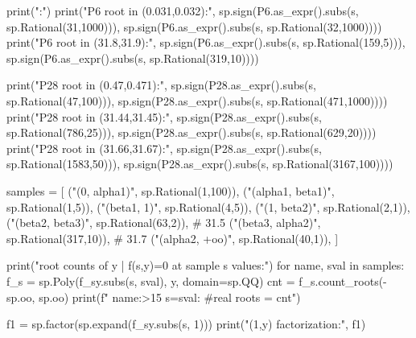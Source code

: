 \documentclass[12pt]{article}
\theoremstyle{remark}
\theoremstyle{definition}
\begin{document}
\begin{code}
print("\nBrackets:")
print("P6 root in (0.031,0.032):", sp.sign(P6.as_expr().subs(s, sp.Rational(31,1000))),
      sp.sign(P6.as_expr().subs(s, sp.Rational(32,1000))))
print("P6 root in (31.8,31.9):", sp.sign(P6.as_expr().subs(s, sp.Rational(159,5))),
      sp.sign(P6.as_expr().subs(s, sp.Rational(319,10))))

print("P28 root in (0.47,0.471):", sp.sign(P28.as_expr().subs(s, sp.Rational(47,100))),
      sp.sign(P28.as_expr().subs(s, sp.Rational(471,1000))))
print("P28 root in (31.44,31.45):", sp.sign(P28.as_expr().subs(s, sp.Rational(786,25))),
      sp.sign(P28.as_expr().subs(s, sp.Rational(629,20))))
print("P28 root in (31.66,31.67):", sp.sign(P28.as_expr().subs(s, sp.Rational(1583,50))),
      sp.sign(P28.as_expr().subs(s, sp.Rational(3167,100))))

samples = [
    ("(0, alpha1)", sp.Rational(1,100)),
    ("(alpha1, beta1)", sp.Rational(1,5)),
    ("(beta1, 1)", sp.Rational(4,5)),
    ("(1, beta2)", sp.Rational(2,1)),
    ("(beta2, beta3)", sp.Rational(63,2)),     # 31.5
    ("(beta3, alpha2)", sp.Rational(317,10)),  # 31.7
    ("(alpha2, +oo)", sp.Rational(40,1)),
]

print("\nReal root counts of y | f(s,y)=0 at sample s values:")
for name, sval in samples:
    f_s = sp.Poly(f_sy.subs(s, sval), y, domain=sp.QQ)
    cnt = f_s.count_roots(-sp.oo, sp.oo)
    print(f"  {name:>15}  s={sval}:  #real roots = {cnt}")

f1 = sp.factor(sp.expand(f_sy.subs(s, 1)))
print("\nf(1,y) factorization:", f1)
\end{code}
\end{document}
